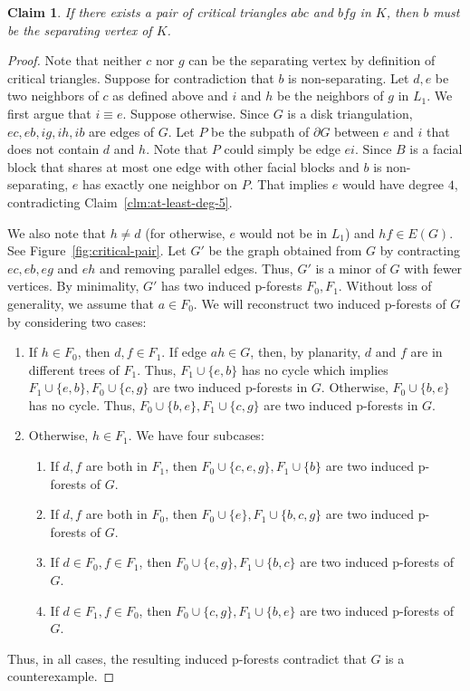 \documentclass[11pt]{article}
\newtheorem{claim}[theorem]{Claim}
\begin{document}
\begin{claim}\label{clm:critic-pair}
If there exists a pair of critical triangles $abc$ and $bfg$ in $K$, then $b$ must be the separating vertex of $K$.
\end{claim}
\begin{proof}
Note that neither $c$ nor $g$ can be the separating vertex by definition of critical triangles. Suppose for contradiction that $b$ is non-separating. Let $d,e$ be two neighbors of $c$ as defined above and $i$ and $h$ be the neighbors of $g$ in $L_1$. We first argue that $i \equiv e$. Suppose otherwise. Since $G$ is a disk triangulation, $ec,eb, ig, ih, ib$ are edges of $G$. Let $P$ be the subpath of $\partial G$ between $e$ and $i$ that does not contain $d$ and $h$. Note that $P$ could simply be edge $ei$. Since $B$ is a facial block that shares at most one edge with other facial blocks and $b$ is non-separating, $e$ has exactly one neighbor on $P$. That implies $e$ would have degree $4$, contradicting Claim~\ref{clm:at-least-deg-5}.

We also note that $h \not= d$ (for otherwise, $e$ would not be in $L_1$) and $hf \in E(G)$. See Figure~\ref{fig:critical-pair}. Let $G'$ be the graph obtained from $G$ by contracting $ec,eb,eg$ and $eh$ and removing parallel edges. Thus, $G'$ is a minor of $G$ with fewer vertices.  By minimality, $G'$ has two induced p-forests $F_0,F_1$. Without loss of generality, we assume that $a \in F_0$. We will reconstruct two induced p-forests of $G$  by considering two cases:

\begin{enumerate}
\item If $h \in F_0$, then $d,f \in F_1$. If edge $ah \in G$, then, by planarity, $d$ and $f$ are in different trees of $F_1$. Thus, $F_1 \cup \{e,b\}$ has no cycle which implies $F_1\cup \{e,b\}, F_0\cup \{c,g\}$ are two induced p-forests in $G$. Otherwise, $F_0\cup \{b,e\}$ has no cycle. Thus, $F_0\cup \{b,e\}, F_1 \cup \{c,g\}$ are two induced p-forests in $G$. 
\item Otherwise, $h \in F_1$. We have four subcases:
	\begin{enumerate}
		\item If $d,f$ are both in $F_1$, then $F_0 \cup \{c,e,g\}, F_1 \cup \{b\}$ are two induced p-forests of $G$.
		\item If $d,f$ are both in $F_0$, then $F_0 \cup \{e\}, F_1 \cup \{b,c,g\}$ are two induced p-forests of $G$.
		\item If $d \in F_0, f \in F_1$, then $F_0 \cup \{e,g\}, F_1 \cup \{b,c\}$ are two induced p-forests of $G$.
		\item If $d \in F_1, f \in F_0$, then $F_0 \cup \{c,g\}, F_1 \cup \{b,e\}$ are two induced p-forests of $G$.		
	\end{enumerate}
\end{enumerate}
Thus, in all cases, the resulting induced p-forests contradict that $G$ is a counterexample.
\end{proof}
\end{document}
